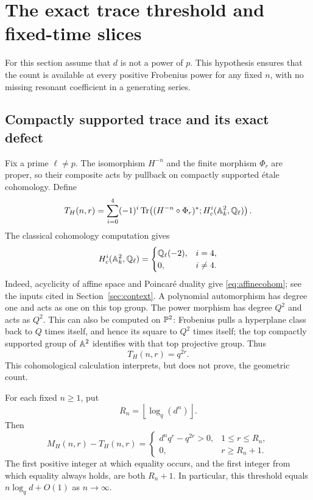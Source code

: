 \section{The exact trace threshold and fixed-time slices}\label{sec:slices}

For this section assume that $d$ is not a power of $p$. This hypothesis
ensures that the count is available at every positive Frobenius power
for any fixed $n$, with no missing resonant coefficient in a generating
series.

\subsection{Compactly supported trace and its exact defect}

Fix a prime $\ell\ne p$. The isomorphism $H^{-n}$ and the finite
morphism $\Phi_r$ are proper, so their composite acts by pullback on
compactly supported \texorpdfstring{\'etale}{etale} cohomology. Define
\begin{equation}\label{eq:cohomtrace}
 T_H(n,r)=\sum_{i=0}^4(-1)^i
 \operatorname{Tr}\!\left((H^{-n}\circ\Phi_r)^*;
 H_c^i(\mathbb A^2_k,\mathbb Q_{\ell})\right).
\end{equation}
The classical cohomology computation gives
\begin{equation}\label{eq:affinecohom}
 H_c^i(\mathbb A^2_k,\mathbb Q_{\ell})=
 \begin{cases}\mathbb Q_{\ell}(-2),&i=4,\\0,&i\ne4.\end{cases}
\end{equation}
Indeed, acyclicity of affine space and Poincar\'e duality give
\eqref{eq:affinecohom}; see the inputs cited in
Section~\ref{sec:context}. A polynomial automorphism has degree one
and acts as one on this top group. The power morphism has degree $Q^2$
and acts as $Q^2$. This can also be computed on $\mathbb P^2$: Frobenius
pulls a hyperplane class back to $Q$ times itself, and hence its square
to $Q^2$ times itself; the top compactly supported group of $\mathbb A^2$
identifies with that top projective group. Thus
\begin{equation}\label{eq:tracevalue}
 T_H(n,r)=q^{2r}.
\end{equation}
This cohomological calculation interprets, but does not prove, the
geometric count.

\begin{proposition}\label{prop:threshold}
For each fixed $n\geq1$, put
\begin{equation}\label{eq:Rn}
 R_n=\left\lfloor\log_q(d^n)\right\rfloor.
\end{equation}
Then
\begin{equation}\label{eq:defect}
 M_H(n,r)-T_H(n,r)=
 \begin{cases}
 d^nq^r-q^{2r}>0,&1\leq r\leq R_n,\\
 0,&r\geq R_n+1.
 \end{cases}
\end{equation}
The first positive integer at which equality occurs, and the first
integer from which equality always holds, are both $R_n+1$.
In particular, this threshold equals
$n\log_qd+O(1)$ as $n\to\infty$.
\end{proposition}

